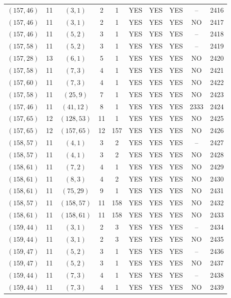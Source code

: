 \begin{longtable}{|c|c|c|c|c|c|c|c|c|c|}
$(157, 46)$ & 11 & $(3, 1)$ & 2 & 1 & YES & YES & YES & -- & 2416\\
$(157, 46)$ & 11 & $(3, 1)$ & 2 & 1 & YES & YES & YES & NO & 2417\\
$(157, 46)$ & 11 & $(5, 2)$ & 3 & 1 & YES & YES & YES & -- & 2418\\
$(157, 58)$ & 11 & $(5, 2)$ & 3 & 1 & YES & YES & YES & -- & 2419\\
$(157, 28)$ & 13 & $(6, 1)$ & 5 & 1 & YES & YES & YES & NO & 2420\\
$(157, 58)$ & 11 & $(7, 3)$ & 4 & 1 & YES & YES & YES & NO & 2421\\
$(157, 60)$ & 11 & $(7, 3)$ & 4 & 1 & YES & YES & YES & NO & 2422\\
$(157, 58)$ & 11 & $(25, 9)$ & 7 & 1 & YES & YES & YES & NO & 2423\\
$(157, 46)$ & 11 & $(41, 12)$ & 8 & 1 & YES & YES & YES & 2333 & 2424\\
$(157, 65)$ & 12 & $(128, 53)$ & 11 & 1 & YES & YES & YES & NO & 2425\\
$(157, 65)$ & 12 & $(157, 65)$ & 12 & 157 & YES & YES & YES & NO & 2426\\
$(158, 57)$ & 11 & $(4, 1)$ & 3 & 2 & YES & YES & YES & -- & 2427\\
$(158, 57)$ & 11 & $(4, 1)$ & 3 & 2 & YES & YES & YES & NO & 2428\\
$(158, 61)$ & 11 & $(7, 2)$ & 4 & 1 & YES & YES & YES & NO & 2429\\
$(158, 61)$ & 11 & $(8, 3)$ & 4 & 2 & YES & YES & YES & NO & 2430\\
$(158, 61)$ & 11 & $(75, 29)$ & 9 & 1 & YES & YES & YES & NO & 2431\\
$(158, 57)$ & 11 & $(158, 57)$ & 11 & 158 & YES & YES & YES & NO & 2432\\
$(158, 61)$ & 11 & $(158, 61)$ & 11 & 158 & YES & YES & YES & NO & 2433\\
$(159, 44)$ & 11 & $(3, 1)$ & 2 & 3 & YES & YES & YES & -- & 2434\\
$(159, 44)$ & 11 & $(3, 1)$ & 2 & 3 & YES & YES & YES & NO & 2435\\
$(159, 47)$ & 11 & $(5, 2)$ & 3 & 1 & YES & YES & YES & -- & 2436\\
$(159, 47)$ & 11 & $(5, 2)$ & 3 & 1 & YES & YES & YES & NO & 2437\\
$(159, 44)$ & 11 & $(7, 3)$ & 4 & 1 & YES & YES & YES & -- & 2438\\
$(159, 44)$ & 11 & $(7, 3)$ & 4 & 1 & YES & YES & YES & NO & 2439\\

\end{longtable}
